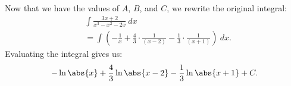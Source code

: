 \documentclass{report}
\begin{document}
     \pagebreak \bigbreak \noindent 
     Now that we have the values of  $A$, $B$, and  $C$, we rewrite the original integral:
     \begin{align*}
         &\int \frac{3x+2}{ x^{3}-x^{2}-2x}\ dx  \\
         &=\int \left(-\frac{1}{x}+\frac{4}{3}\cdot \frac{1}{(x-2)}-\frac{1}{3}\cdot \frac{1}{(x+1)}\right)\ dx
     .\end{align*}
     \bigbreak \noindent 
     Evaluating the integral gives us:
     \begin{align*}
        -\ln{\abs{x}} +\frac{4}{3}\ln{\abs{x-2}} -\frac{1}{3}\ln{\abs{x+1}} +C  
     .\end{align*}
     \bigbreak \noindent 

     \bigbreak \noindent 
\end{document}
